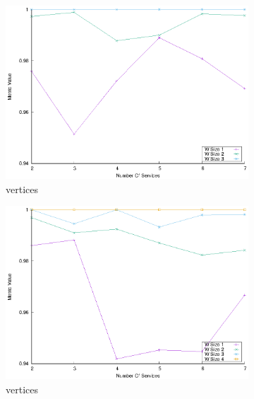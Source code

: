 \begin{figure}[!htb]
  \begin{subfigure}{0.48\textwidth}
    \includegraphics[width=\textwidth]{Images/graphs/window_quality_performance_diff_qual_n7_s7_20_100_n3}
    \caption{ vertices}
    \label{fig:quality_window_wide_qualitative_n3}
  \end{subfigure}
  \begin{subfigure}{0.48\textwidth}
    \includegraphics[width=\textwidth]{Images/graphs/window_quality_performance_diff_qual_n7_s7_20_100_n4}
    \caption{ vertices}
    \label{fig:quality_window_wide_qualitative_n4}
  \end{subfigure}
  \begin{subfigure}{0.48\textwidth}

\end{subfigure}
\end{figure}
